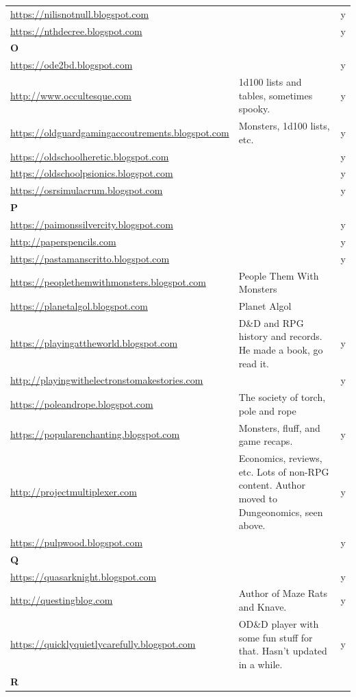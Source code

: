 \documentclass[a4paper, 11pt, twoside]{article}
\begin{document}
\begin{longtable}{p{6cm}p{8cm}c}
\url{https://nilisnotnull.blogspot.com} &  & y\\
\url{https://nthdecree.blogspot.com} &  & y\\
\textbf{O} &  & \\
\url{https://ode2bd.blogspot.com} &  & y\\
\url{http://www.occultesque.com} & 1d100 lists and tables, sometimes spooky. & y\\
\url{https://oldguardgamingaccoutrements.blogspot.com} & Monsters, 1d100 lists, etc. & y\\
\url{https://oldschoolheretic.blogspot.com} &  & y\\
\url{https://oldschoolpsionics.blogspot.com} &  & y\\
\url{https://osrsimulacrum.blogspot.com} &  & y\\
\textbf{P} &  & \\
\url{https://paimonssilvercity.blogspot.com} &  & y\\
\url{http://paperspencils.com} &  & y\\
\url{https://pastamanscritto.blogspot.com} &  & y\\
\url{https://peoplethemwithmonsters.blogspot.com} & People Them With Monsters & \\
\url{https://planetalgol.blogspot.com} & Planet Algol & \\
\url{https://playingattheworld.blogspot.com} & D\&D and RPG history and records. He made a book, go read it. & y\\
\url{http://playingwithelectronstomakestories.com} &  & y\\
\url{https://poleandrope.blogspot.com} & The society of torch, pole and rope & \\
\url{https://popularenchanting.blogspot.com} & Monsters, fluff, and game recaps. & y\\
\url{http://projectmultiplexer.com} & Economics, reviews, etc. Lots of non-RPG content. Author moved to Dungeonomics, seen above. & y\\
\url{https://pulpwood.blogspot.com} &  & y\\
\textbf{Q} &  & \\
\url{https://quasarknight.blogspot.com} &  & y\\
\url{http://questingblog.com} & Author of Maze Rats and Knave. & y\\
\url{https://quicklyquietlycarefully.blogspot.com} & OD\&D player with some fun stuff for that. Hasn't updated in a while. & y\\
\textbf{R} &  & \\

\end{longtable}
\end{document}
